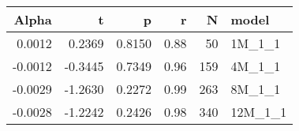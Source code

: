 \begin{table}[ht]
\centering
\begin{tabular}{rrrrrl}
  \hline
Alpha & t & p & r & N & model \\ 
  \hline
0.0012 & 0.2369 & 0.8150 & 0.88 & 50 & 1M\_1\_1 \\ 
  -0.0012 & -0.3445 & 0.7349 & 0.96 & 159 & 4M\_1\_1 \\ 
  -0.0029 & -1.2630 & 0.2272 & 0.99 & 263 & 8M\_1\_1 \\ 
  -0.0028 & -1.2242 & 0.2426 & 0.98 & 340 & 12M\_1\_1 \\ 
   \hline
\end{tabular}
\end{table}

